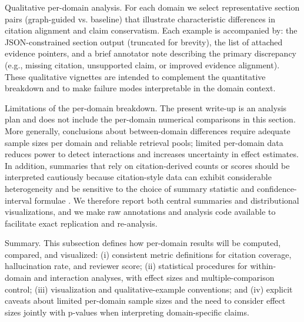 Qualitative per-domain analysis. For each domain we select representative section pairs (graph-guided vs. baseline) that illustrate characteristic differences in citation alignment and claim conservatism. Each example is accompanied by: the JSON-constrained section output (truncated for brevity), the list of attached evidence pointers, and a brief annotator note describing the primary discrepancy (e.g., missing citation, unsupported claim, or improved evidence alignment). These qualitative vignettes are intended to complement the quantitative breakdown and to make failure modes interpretable in the domain context.

Limitations of the per-domain breakdown. The present write-up is an analysis plan and does not include the per-domain numerical comparisons in this section. More generally, conclusions about between-domain differences require adequate sample sizes per domain and reliable retrieval pools; limited per-domain data reduces power to detect interactions and increases uncertainty in effect estimates. In addition, summaries that rely on citation-derived counts or scores should be interpreted cautiously because citation-style data can exhibit considerable heterogeneity and be sensitive to the choice of summary statistic and confidence-interval formulae \cite{web_varin_2013_statistical_modelling_of_citation_exchange_betwee,web_adler_2009_citation_statistics,web_thelwall_2015_the_precision_of_the_arithmetic_mean_geometric_m}. We therefore report both central summaries and distributional visualizations, and we make raw annotations and analysis code available to facilitate exact replication and re-analysis.

Summary. This subsection defines how per-domain results will be computed, compared, and visualized: (i) consistent metric definitions for citation coverage, hallucination rate, and reviewer score; (ii) statistical procedures for within-domain and interaction analyses, with effect sizes and multiple-comparison control; (iii) visualization and qualitative-example conventions; and (iv) explicit caveats about limited per-domain sample sizes and the need to consider effect sizes jointly with p-values when interpreting domain-specific claims.